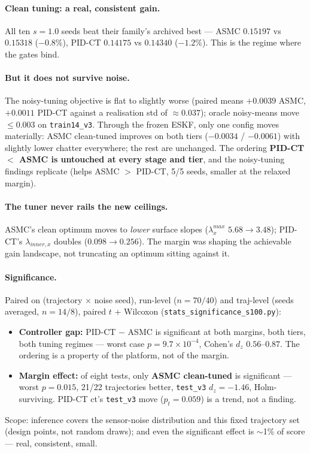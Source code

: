 \documentclass[11pt]{article}
\begin{document}
\paragraph{Clean tuning: a real, consistent gain.} All ten $s{=}1.0$ seeds beat their
family's archived best --- ASMC $0.15197$ vs $0.15318$ ($-0.8\%$), PID-CT $0.14175$ vs
$0.14340$ ($-1.2\%$). This is the regime where the gates bind.

\paragraph{But it does not survive noise.} The noisy-tuning objective is flat to
slightly worse (paired means $+0.0039$ ASMC, $+0.0011$ PID-CT against a realisation
std of $\approx 0.037$); oracle noisy-means move $\le 0.003$ on \texttt{train14\_v3}.
Through the frozen ESKF, only one config moves materially: ASMC clean-tuned improves on
both tiers ($-0.0034$ / $-0.0061$) with slightly lower chatter everywhere; the rest are
unchanged. The ordering \textbf{PID-CT $<$ ASMC is untouched at every stage and tier},
and the noisy-tuning findings replicate (helps ASMC $>$ PID-CT, 5/5 seeds, smaller at
the relaxed margin).

\paragraph{The tuner never rails the new ceilings.} ASMC's clean optimum moves to
\emph{lower} surface slopes ($\lambda_x^{max}$ $5.68\to3.48$); PID-CT's
$\lambda_{inner,x}$ doubles ($0.098\to0.256$). The margin was shaping the achievable
gain landscape, not truncating an optimum sitting against it.

\paragraph{Significance.} Paired on (trajectory $\times$ noise seed), run-level
($n=70/40$) and traj-level (seeds averaged, $n=14/8$), paired $t$ + Wilcoxon
(\texttt{stats\_significance\_s100.py}):
\begin{itemize}[nosep]
\item \textbf{Controller gap:} PID-CT $-$ ASMC is significant at both margins, both
      tiers, both tuning regimes --- worst case $p=9.7\!\times\!10^{-4}$, Cohen's
      $d_z$ $0.56$--$0.87$. The ordering is a property of the platform, not of the
      margin.
\item \textbf{Margin effect:} of eight tests, only \textbf{ASMC clean-tuned} is
      significant --- worst $p=0.015$, 21/22 trajectories better, \texttt{test\_v3}
      $d_z=-1.46$, Holm-surviving. PID-CT ct's \texttt{test\_v3} move ($p_t=0.059$) is
      a trend, not a finding.
\end{itemize}
Scope: inference covers the sensor-noise distribution and this fixed trajectory set
(design points, not random draws); and even the significant effect is $\sim$1\% of
score --- real, consistent, small.
\end{document}
